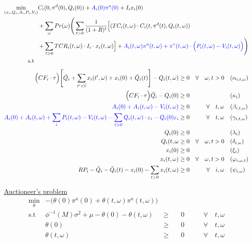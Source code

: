 \documentclass[11pt, letterpaper]{article}
\newcommand{\pia}{\textcolor[rgb]{0,0,1}}
\begin{document}
\begin{align}
\min_{(x_i,Q_i,A_i,P_i,V_i)} &  C_i(0, \pi^d(0),Q_i(0))+\pia{A_i(0) \pi^{a}(0) }+ I_i x_i(0) \nonumber \\ &+\sum_{\omega} Pr(\omega)   \Bigg( \sum_{t>0} \frac{1}{(1+R)^t} \Big[ (TC_i(t,\omega)\cdot C_i(t,\pi^d(t),Q_i(t,\omega) )  \nonumber \\
 & + \sum_{t > 0} TCR_i(t,\omega) \cdot I_i\cdot x_i(t,\omega) \Big] + \pia{A_i(t,\omega)\pi^a(t,\omega)+\pi^v(t,\omega)\cdot \Big(P_i(t,\omega)-V_i(t,\omega)\Big)} \Bigg)  \\
     \textrm{s.t \ } \nonumber
\end{align}
\begin{align}
    \Big(CF_i \cdot\tau\Big)  \Bigg[\bar{Q_i} + \sum_{t^{\prime}<\bar{t}} x_i(t^\prime,\omega) + x_i(0)+ \bar{Q}_i(t) \Bigg] - Q_i(t,\omega) & \geq 0  & \forall  \quad \omega, t  > 0 & \quad (\alpha_{i,t,\omega}) \\
    \Big(CF_i\cdot\tau \Big)\bar{Q_i}-Q_{i}(0) & \geq 0  &  \quad & \quad (\kappa_i) \\
\pia{ A_{i}(0)+A_i(t,\omega) - V_i(t,\omega) } & \geq  0  & \forall  \quad t,\omega & \quad (\beta_{i,t,\omega})\\
  \pia{ A_{i}(0)+A_i(t,\omega) + \sum_{i}P_i(t,\omega) - V_i(t,\omega)-\sum_{t>0}Q_i(t, \omega)\cdot \varepsilon_{i}-Q_i(0)\varepsilon_{i}} & \geq  0  &\forall \quad t,\omega & \quad (\gamma_{i,t,\omega})\\
 Q_i(0) & \geq  0 & \quad & \quad (\lambda_i)\\
 Q_i(t, \omega & \geq  0   & \forall  \quad \omega, t >0 & \quad (\delta_{i,\omega})\\
  x_i(0) & \geq  0 & \quad & \quad (\xi_i)\\
  x_i(t, \omega) & \geq  0   & \forall  \quad \omega, t >0 & \quad (\varphi_{i,\omega,t})\\
 RP_i - \bar{Q}_i - \bar{Q}_i(t) - x_i(0) - \sum_{t > 0} x_i(t,\omega)  &  \geq 0 &  \forall \quad i,\omega &  \quad (\psi_{i,\omega}) 
  \end{align}

\underline{Auctioneer's problem}
\pia{
\begin{align}
    \min_{\theta} & -\Big(\theta(0)\pi^a(0)+\theta(t,\omega) \pi^{a}(t,\omega)\Big) & &  &\\
    \textrm{s.t \ } &  \phi^{-1}(M) \sigma^2 + \mu - \theta(0)- \theta(t,\omega) &  \geq & \quad 0  &\quad \quad  \forall  \quad t,\omega\\
    &  \theta(0)  & \geq & \quad 0 & \quad \quad  \forall \quad t,\omega\\
    &  \theta(t,\omega)  & \geq & \quad 0 & \quad \quad  \forall \quad t,\omega
\end{align}
}
\vspace{0.5cm}
\end{document}
